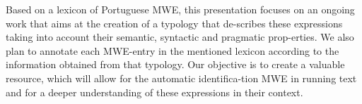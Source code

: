 Based on a lexicon of Portuguese MWE, this presentation focuses on an ongoing work that aims at the creation of a typology that de-scribes these expressions
 taking into account their semantic, syntactic and pragmatic prop-erties. We
 also plan to annotate each MWE-entry in the mentioned lexicon according to the
 information obtained from that typology. Our objective is to create a valuable
 resource, which will allow for the automatic identifica-tion MWE in running
 text and for a deeper understanding of these expressions in their context.

